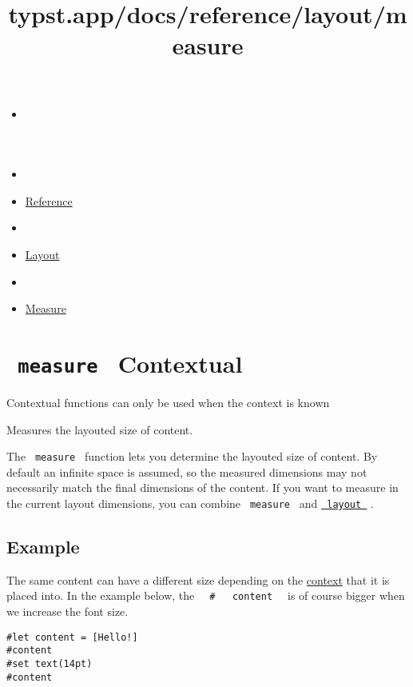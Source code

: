 \title{typst.app/docs/reference/layout/measure}

\begin{itemize}
\tightlist
\item
  \href{/docs}{}
\item
  
\item
  \href{/docs/reference/}{Reference}
\item
  
\item
  \href{/docs/reference/layout/}{Layout}
\item
  
\item
  \href{/docs/reference/layout/measure/}{Measure}
\end{itemize}

\section{\texorpdfstring{\texttt{\ measure\ } {{ Contextual
}}}{ measure   Contextual }}\label{summary}

\label{contextual-tooltip}
Contextual functions can only be used when the context is known

Measures the layouted size of content.

The \texttt{\ measure\ } function lets you determine the layouted size
of content. By default an infinite space is assumed, so the measured
dimensions may not necessarily match the final dimensions of the
content. If you want to measure in the current layout dimensions, you
can combine \texttt{\ measure\ } and
\href{/docs/reference/layout/layout/}{\texttt{\ layout\ }} .

\subsection{Example}\label{example}

The same content can have a different size depending on the
\href{/docs/reference/context/}{context} that it is placed into. In the
example below, the
\texttt{\ }{\texttt{\ \#\ }}\texttt{\ }{\texttt{\ content\ }}\texttt{\ }
is of course bigger when we increase the font size.

\begin{verbatim}
#let content = [Hello!]
#content
#set text(14pt)
#content
\end{verbatim}

